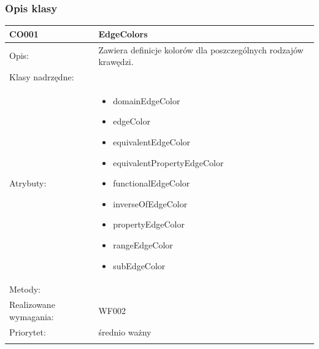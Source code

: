 \subsubsection{Opis klasy}

\begin{center}
 


\begin{longtable}{|m{3cm}|m{9cm}|} \hline

CO001 & EdgeColors \\ \hline
Opis: & Zawiera definicje kolorów dla poszczególnych rodzajów krawędzi.   \\ \hline
Klasy nadrzędne: &     \\ \hline
Atrybuty: & \begin{itemize}
 \item domainEdgeColor
 \item edgeColor
 \item equivalentEdgeColor
 \item equivalentPropertyEdgeColor
 \item functionalEdgeColor
 \item inverseOfEdgeColor
 \item propertyEdgeColor
 \item rangeEdgeColor
 \item subEdgeColor

\end{itemize}
 \\ \hline
Metody: & %
  \\ \hline
Realizowane wymagania: & WF002 \\ \hline
Priorytet: & średnio ważny \\ \hline

\multicolumn{2}{c}{} \\
 \hline


\end{longtable}
\end{center}
